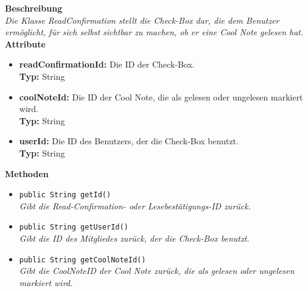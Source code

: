 	\textbf{Beschreibung} \\
	\textit{Die Klasse ReadConfirmation stellt die Check-Box dar, die dem Benutzer ermöglicht, für sich selbst sichtbar zu machen, ob er eine Cool Note gelesen hat.} \\
	
	\textbf{Attribute}
	\begin{itemize}
		\item \textbf{readConfirmationId:} Die ID der Check-Box. \\
		\textbf{Typ:} String
		\item \textbf{coolNoteId:} Die ID der Cool Note, die als gelesen oder ungelesen markiert wird. \\
		\textbf{Typ:} String
		\item \textbf{userId:} Die ID des Benutzers, der die Check-Box benutzt. \\
		\textbf{Typ:} String
	\end{itemize}
	
	\textbf{Methoden}
	\begin{itemize}
		\item\texttt{{public String getId()}}\\
		\textit{Gibt die Read-Confirmation- oder Lesebestätigungs-ID zurück.}\\
		
		\item\texttt{{public String getUserId()}}\\
		\textit{Gibt die ID des Mitgliedes zurück, der die Check-Box benutzt.}\\
		
		\item\texttt{{public String getCoolNoteId()}}\\
		\textit{Gibt die CoolNoteID der Cool Note zurück, die als gelesen oder ungelesen markiert wird.}\\
	\end{itemize}
